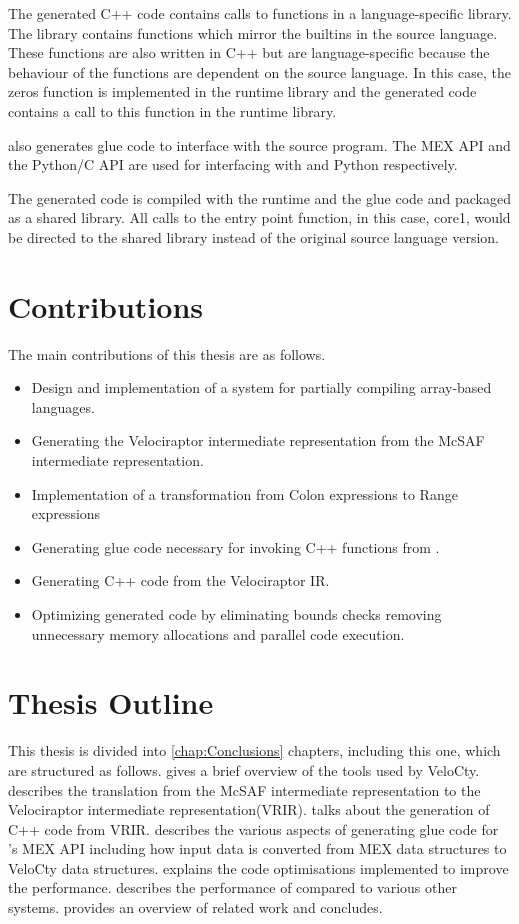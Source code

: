 The generated C++ code contains calls to functions in a language-specific library. The library contains functions which mirror the builtins in the source language. These functions are also written in C++ but are language-specific because the behaviour of the functions are dependent on the source language. In this case, the \textsf{zeros} function is implemented in the runtime library and the generated code contains a call to this function in the runtime library. 

\velocty also generates glue code to interface with the source program. The MEX API and the Python/C\cite{pyc} API are used for interfacing with \matlab and Python respectively. 

The generated code is compiled with the runtime and the glue code and packaged as a shared library. All calls to the entry point function, in this case, core1, would be directed to the shared library instead of the original source language version.\\
\section{Contributions}
The main contributions of this thesis are as follows.
\begin{itemize}
\item Design and implementation of a system for partially compiling array-based languages. 
\item Generating the Velociraptor intermediate representation from the McSAF intermediate representation. 
\item Implementation of a transformation from  Colon expressions to Range expressions
\item Generating glue code necessary for invoking C++ functions from \matlab.
\item Generating C++ code from the Velociraptor IR.
\item Optimizing generated code by eliminating bounds checks removing unnecessary memory allocations and parallel code execution.
\end{itemize}
\section{Thesis Outline}
This thesis is divided into \ref{chap:Conclusions} chapters, including this one, which are structured as follows.
 gives a brief overview of the tools
used by VeloCty.
 describes the translation from the McSAF intermediate representation to the Velociraptor intermediate representation(VRIR).
 talks about the generation of C++ code from VRIR.
 describes the various aspects of generating glue code for \matlab's MEX API including how input data is converted from MEX data structures to VeloCty data structures. 
 explains the code optimisations implemented to improve the performance. 
 describes the performance of \velocty compared to various other systems. 
 provides an overview of related work and
 concludes.
